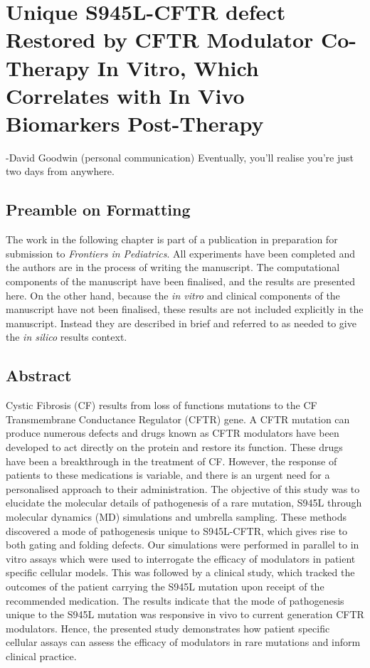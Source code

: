 \chapter{Unique S945L-CFTR defect Restored by CFTR Modulator Co-Therapy In Vitro, Which Correlates with In Vivo Biomarkers Post-Therapy}
\label{chap:S945L}

\setcounter{figure}{0}
\renewcommand{\thefigure}{\arabic{chapter}.\arabic{figure}}

\begin{chapquote}{-David Goodwin (personal communication)}
Eventually, you'll realise you're just two days from anywhere.
\end{chapquote}


\section*{\centering Preamble on Formatting} 
The work in the following chapter is part of a publication in preparation for submission to \textit{Frontiers in Pediatrics}. All experiments have been completed and the authors are in the process of writing the manuscript. The computational components of the manuscript have been finalised, and the results are presented here. On the other hand, because the \textit{in vitro} and clinical components of the manuscript have not been finalised, these results are not included explicitly in the manuscript. Instead they are described in brief and referred to as needed to give the \textit{in silico} results context.

\section*{\centering Abstract} 

Cystic Fibrosis (CF) results from loss of functions mutations to the CF Transmembrane Conductance Regulator (CFTR) gene. A CFTR mutation can produce numerous defects and drugs known as CFTR modulators have been developed to act directly on the protein and restore its function. These drugs have been a breakthrough in the treatment of CF. However, the response of patients to these medications is variable, and there is an urgent need for a personalised approach to their administration. The objective of this study was to elucidate the molecular details of pathogenesis of a rare mutation, S945L through molecular dynamics (MD) simulations and umbrella sampling. These methods discovered a mode of pathogenesis unique to S945L-CFTR, which gives rise to both gating and folding defects. Our simulations were performed in parallel to in vitro assays which were used to interrogate the efficacy of modulators in patient specific cellular models. This was followed by a clinical study, which tracked the outcomes of the patient carrying the S945L mutation upon receipt of the recommended medication. The results indicate that the mode of pathogenesis unique to the S945L mutation was responsive in vivo to current generation CFTR modulators. Hence, the presented study demonstrates how patient specific cellular assays can assess the efficacy of modulators in rare mutations and inform clinical practice.


